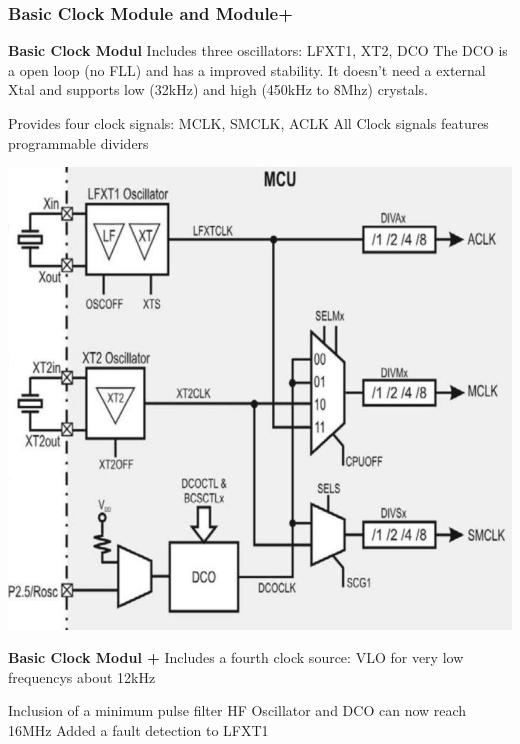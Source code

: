 \subsubsection{Basic Clock Module and Module+}
\begin{minipage}{0.585\linewidth}
    \textbf{Basic Clock Modul}\newline
    Includes three oscillators:\newline
    LFXT1, XT2, DCO\newline
    The \acs{DCO} is a open loop (no \acs{FLL}) and has a improved stability. \newline
    It doesn't need a external Xtal and supports low (32kHz) and high (450kHz to 8Mhz) crystals.\newline\newline
    
    Provides four clock signals:\newline
    \acs{MCLK}, \acs{SMCLK}, \acs{ACLK} \newline
    All Clock signals features programmable dividers
\end{minipage}
\begin{minipage}{0.41\linewidth}
    \includegraphics[width=0.8\linewidth]{images/BasicClock} 
\end{minipage}
\vspace{0.5cm}
\begin{minipage}{0.585\linewidth}
    \textbf{Basic Clock Modul +}\newline\newline
    Includes a fourth clock source:\newline
    VLO for very low frequencys about 12kHz\newline\newline
    
    Inclusion of a minimum pulse filter \newline
    \acs{HF} Oscillator and \acs{DCO} can now reach 16MHz\newline
    Added a fault detection to LFXT1
\end{minipage}
